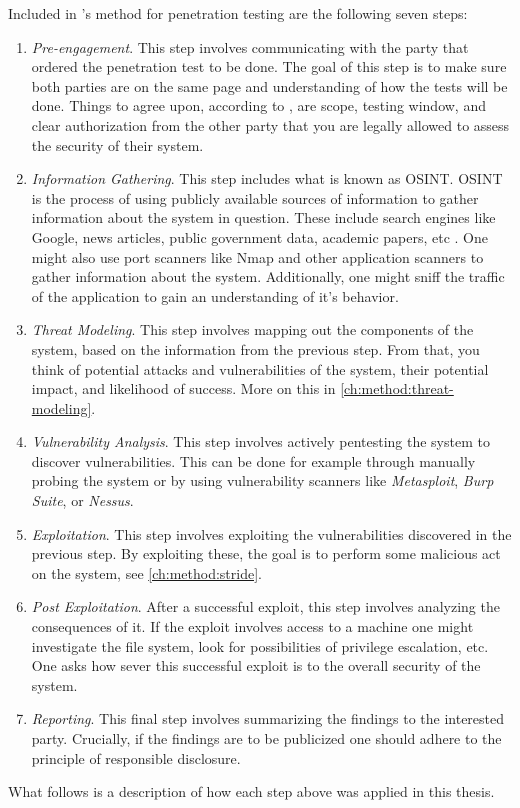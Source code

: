 Included in \citeauthor{weidman2014}'s method for penetration testing are the following seven steps:
\begin{enumerate}
    \item \textit{Pre-engagement}. This step involves communicating with the party that ordered the penetration test to be done. The goal of this step is to make sure both parties are on the same page and understanding of how the tests will be done. Things to agree upon, according to \citeauthor{weidman2014}, are scope, testing window, and clear authorization from the other party that you are legally allowed to assess the security of their system.
    \item \textit{Information Gathering}. This step includes what is known as \gls{OSINT}. \gls{OSINT} is the process of using publicly available sources of information to gather information about the system in question. These include search engines like Google, news articles, public government data, academic papers, etc \cite{steele2007open}. One might also use port scanners like Nmap and other application scanners to gather information about the system. Additionally, one might sniff the traffic of the application to gain an understanding of it's behavior.
    \item \textit{Threat Modeling}. This step involves mapping out the components of the system, based on the information from the previous step. From that, you think of potential attacks and vulnerabilities of the system, their potential impact, and likelihood of success. More on this in \ref{ch:method:threat-modeling}.
    \item \textit{Vulnerability Analysis}. This step involves actively pentesting the system to discover vulnerabilities. This can be done for example through manually probing the system or by using vulnerability scanners like \textit{Metasploit}, \textit{Burp Suite}, or \textit{Nessus}.
    \item \textit{Exploitation}. This step involves exploiting the vulnerabilities discovered in the previous step. By exploiting these, the goal is to perform some malicious act on the system, see \ref{ch:method:stride}.
    \item \textit{Post Exploitation}. After a successful exploit, this step involves analyzing the consequences of it. If the exploit involves access to a machine one might investigate the file system, look for possibilities of privilege escalation, etc. One asks how sever this successful exploit is to the overall security of the system.
    \item \textit{Reporting}. This final step involves summarizing the findings to the interested party. Crucially, if the findings are to be publicized one should adhere to the principle of responsible disclosure.
\end{enumerate}
What follows is a description of how each step above was applied in this thesis.

